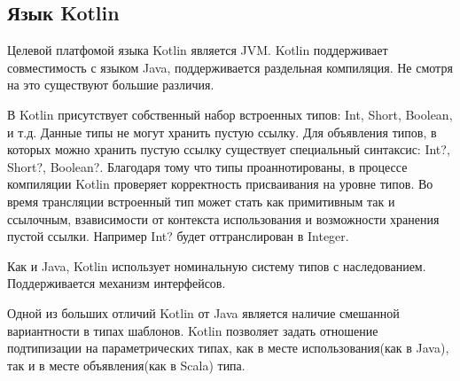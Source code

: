 \subsection{Язык Kotlin}

Целевой платфомой языка Kotlin является JVM. Kotlin поддерживает совместимость с языком Java, поддерживается раздельная компиляция. Не смотря на это существуют большие различия.

В Kotlin присутствует собственный набор встроенных типов: Int, Short, Boolean, и т.д. Данные типы не могут хранить пустую ссылку. Для объявления типов, в которых можно хранить пустую ссылку существует специальный синтаксис: Int?, Short?, Boolean?. Благодаря тому что типы проаннотированы, в процессе компиляции Kotlin проверяет корректность присваивания на уровне типов. Во время трансляции встроенный тип может стать как примитивным так и ссылочным, взависимости от контекста использования и возможности хранения пустой ссылки. Например Int? будет оттранслирован в Integer.

Как и Java, Kotlin использует номинальную систему типов с наследованием. Поддерживается механизм интерфейсов.

Одной из больших отличий Kotlin от Java является наличие смешанной вариантности в типах шаблонов. Kotlin позволяет задать отношение подтипизации на параметрических типах, как в месте использования(как в Java), так и в месте объявления(как в Scala) типа.
